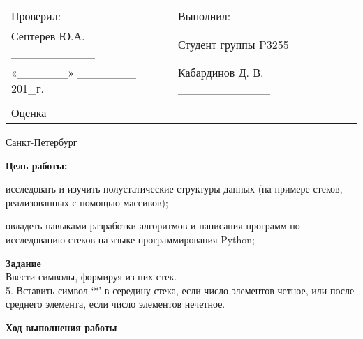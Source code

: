 \documentclass[12pt]{article}
\begin{document}
\begin{center}
\begin{tabular}{lllll}
Проверил:	 	 						& \hspace{80pt}	&	Выполнил:										&\\
Сентерев Ю.А.	 \_\_\_\_\_\_\_\_\_\_	&			    &	Студент группы P3255							&\\
«\_\_\_\_\_\_» 	 \_\_\_\_\_\_\_ 201\_г.  & 				&	Кабардинов Д. В. \_\_\_\_\_\_\_\_\_\_\_			&\\
										&				&													&\\
Оценка\hspace{12pt}\_\_\_\_\_\_\_\_\_	&				&													&\\
\end{tabular}
\par\bigskip\par\bigskip\par\bigskip
                                                  
\par\bigskip \par\bigskip
\end{center}
\par\bigskip\par\bigskip\par\bigskip\par\bigskip\par\bigskip\par\bigskip\par\bigskip\par\bigskip
\begin{center}
Санкт-Петербург
\par{}
\end{center}
\pagebreak
\textbf{ Цель работы:}
\begin{list}{-}{}
\item исследовать и изучить полустатические структуры данных (на примере стеков,
реализованных с помощью массивов);
\item овладеть навыками разработки алгоритмов и написания программ по исследованию
стеков на языке программирования Python;
\end{list}

\textbf{Задание} \\

Ввести символы, формируя из них стек.\\

5. Вставить символ ‘*’ в середину стека, если число элементов четное, или после среднего
элемента, если число элементов нечетное.\\
\par
\textbf{Ход выполнения работы}\\
\end{document}
